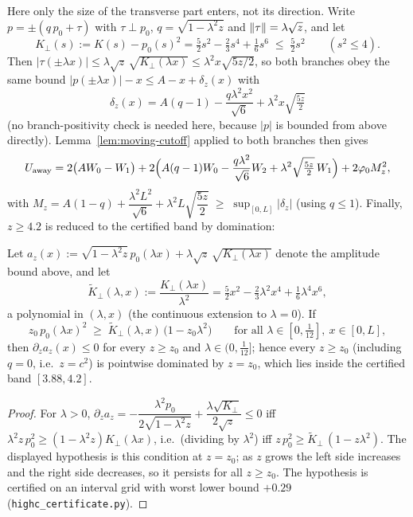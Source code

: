 Here only the size of the transverse part enters, not its direction. Write $p=\pm(q\,p_0+\tau)$ with $\tau\perp p_0$, $q=\sqrt{1-\lambda^2z}$ and $\lVert\tau\rVert=\lambda\sqrt z$, and let
\[
        K_\perp(s):=K(s)-p_0(s)^2=\tfrac52s^2-\tfrac23s^4+\tfrac16s^6\;\le\;\tfrac52s^2
        \qquad(s^2\le4).
\]
Then $|\tau(\pm\lambda x)|\le\lambda\sqrt z\,\sqrt{K_\perp(\lambda x)}\le\lambda^2x\sqrt{5z/2}$, so both branches obey the same bound $|p(\pm\lambda x)|-x\le A-x+\delta_z(x)$ with
\[
        \delta_z(x)=A(q-1)-\frac{q\lambda^2x^2}{\sqrt6}+\lambda^2x\sqrt{\tfrac{5z}2}
\]
(no branch-positivity check is needed here, because $|p|$ is bounded from above directly). Lemma~\ref{lem:moving-cutoff} applied to both branches then gives
\[
        U_{\mathrm{away}}
        =2\bigl(AW_0-W_1\bigr)+2\Bigl(A(q-1)W_0-\frac{q\lambda^2}{\sqrt6}W_2+\lambda^2\sqrt{\tfrac{5z}2}\,W_1\Bigr)
        +2\varphi_0M_z^2,
\]
with $M_z=A(1-q)+\dfrac{\lambda^2L^2}{\sqrt6}+\lambda^2L\sqrt{\dfrac{5z}2}\;\ge\;\sup_{[0,L]}|\delta_z|$ (using $q\le1$). Finally, $z\ge4.2$ is reduced to the certified band by domination:

\begin{lemma}[Domination for $z\ge z_0=4.2$]\label{lem:domination}
Let $a_z(x):=\sqrt{1-\lambda^2z}\,p_0(\lambda x)+\lambda\sqrt z\,\sqrt{K_\perp(\lambda x)}$ denote the amplitude bound above, and let
\[
        \widetilde K_\perp(\lambda,x):=\frac{K_\perp(\lambda x)}{\lambda^2}
        =\tfrac52x^2-\tfrac23\lambda^2x^4+\tfrac16\lambda^4x^6,
\]
a polynomial in $(\lambda,x)$ (the continuous extension to $\lambda=0$). If
\[
        z_0\,p_0(\lambda x)^2\;\ge\;\widetilde K_\perp(\lambda,x)\,\bigl(1-z_0\lambda^2\bigr)
        \qquad\text{for all }\lambda\in[0,\tfrac1{12}],\ x\in[0,L],
\]
then $\partial_za_z(x)\le0$ for every $z\ge z_0$ and $\lambda\in(0,\tfrac1{12}]$; hence every $z\ge z_0$ (including $q=0$, i.e.\ $z=c^2$) is pointwise dominated by $z=z_0$, which lies inside the certified band $[3.88,4.2]$.
\end{lemma}

\begin{proof}
For $\lambda>0$, $\partial_za_z=-\dfrac{\lambda^2p_0}{2\sqrt{1-\lambda^2z}}+\dfrac{\lambda\sqrt{K_\perp}}{2\sqrt z}\le0$ iff $\lambda^2z\,p_0^2\ge(1-\lambda^2z)K_\perp(\lambda x)$, i.e.\ (dividing by $\lambda^2$) iff $z\,p_0^2\ge\widetilde K_\perp\,(1-z\lambda^2)$. The displayed hypothesis is this condition at $z=z_0$; as $z$ grows the left side increases and the right side decreases, so it persists for all $z\ge z_0$. The hypothesis is certified on an interval grid with worst lower bound $+0.29$ (\texttt{highc\_certificate.py}).
\end{proof}

